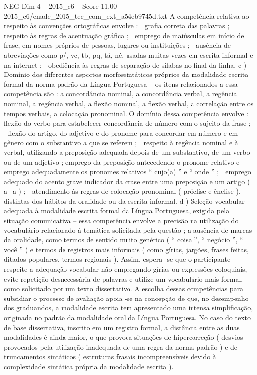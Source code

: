 \begin{textsample}{NEG Dim 4 – 2015\_c6 – Score 11.00 – 2015\_c6/enade\_2015\_tec\_com\_ext\_a54eb9745d.txt}
A competência relativa ao respeito às convenções ortográficas envolve :  grafia correta das palavras ;  respeito às regras de acentuação gráfica ;  emprego de maiúsculas em início de frase, em nomes próprios de pessoas, lugares ou instituições ;  ausência de abreviações como p/, vc, tb, pq, tá, né, usadas muitas vezes em escrita informal e na internet ;  obediência às regras de separação de sílabas no final da linha. c ) Domínio dos diferentes aspectos morfossintáticos próprios da modalidade escrita formal da norma-padrão da Língua Portuguesa – os itens relacionados a essa competência são : a concordância nominal, a concordância verbal, a regência nominal, a regência verbal, a flexão nominal, a flexão verbal, a correlação entre os tempos verbais, a colocação pronominal.
O domínio dessa competência envolve :  flexão do verbo para estabelecer concordância de número com o sujeito da frase ;  flexão do artigo, do adjetivo e do pronome para concordar em número e em gênero com o substantivo a que se referem ;  respeito à regência nominal e à verbal, utilizando a preposição adequada depois de um substantivo, de um verbo ou de um adjetivo ; emprego da preposição antecedendo o pronome relativo e emprego adequadamente os pronomes relativos “ cujo(a) ” e “ onde ” ;  emprego adequado do acento grave indicador da crase entre uma preposição e um artigo ( a+a ) ;  atendimento às regras de colocação pronominal ( próclise e ênclise ), distintas dos hábitos da oralidade ou da escrita informal. d ) Seleção vocabular adequada à modalidade escrita formal da Língua Portuguesa, exigida pela situação comunicativa – essa competência envolve a precisão na utilização do vocabulário relacionado à temática solicitada pela questão ; a ausência de marcas da oralidade, como termos de sentido muito genérico ( “ coisa ”, “ negócio ”, “ você ” ) e termos de registros mais informais ( como gírias, jargões, frases feitas, ditados populares, termos regionais ).
Assim, espera -se que o participante respeite a adequação vocabular não empregando gírias ou expressões coloquiais, evite repetição desnecessária de palavras e utilize um vocabulário mais formal, como solicitado por um texto dissertativo.
A escolha dessas competências para subsidiar o processo de avaliação apoia -se na concepção de que, no desempenho dos graduandos, a modalidade escrita tem apresentado uma intensa simplificação, originada no padrão da modalidade oral da Língua Portuguesa.
No caso do texto de base dissertativa, inscrito em um registro formal, a distância entre as duas modalidades é ainda maior, o que provoca situações de hipercorreção ( desvios provocados pela utilização inadequada de uma regra da norma-padrão ) e de truncamentos sintáticos ( estruturas frasais incompreensíveis devido à complexidade sintática própria da modalidade escrita ).

\end{textsample}
